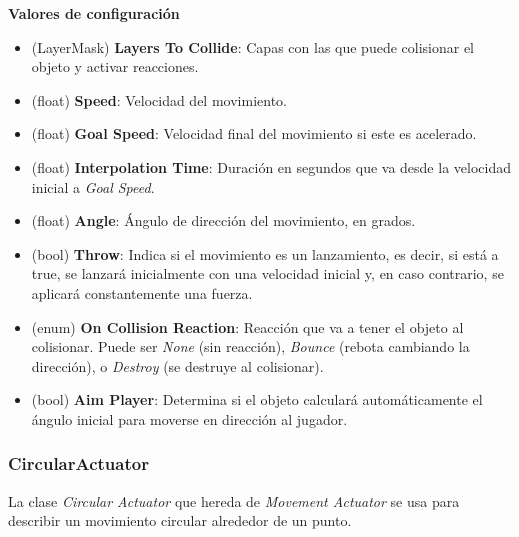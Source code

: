 \textbf{Valores de configuración}
\begin{itemize}
	\item (LayerMask) \textbf{Layers To Collide}: Capas con las que puede colisionar el objeto y activar reacciones.
	\item (float) \textbf{Speed}: Velocidad del movimiento.
	\item (float) \textbf{Goal Speed}: Velocidad final del movimiento si este es acelerado.
	\item (float) \textbf{Interpolation Time}: Duración en segundos que va desde la velocidad inicial a \textit{Goal Speed}.
	\item (float) \textbf{Angle}: Ángulo de dirección del movimiento, en grados.
	\item (bool) \textbf{Throw}: Indica si el movimiento es un lanzamiento, es decir, si está a true, se lanzará inicialmente con una velocidad inicial y, en caso contrario, se aplicará constantemente una fuerza.
	\item (enum) \textbf{On Collision Reaction}: Reacción que va a tener el objeto al colisionar. Puede ser \textit{None} (sin reacción), \textit{Bounce} (rebota cambiando la dirección), o \textit{Destroy} (se destruye al colisionar).
	\item (bool) \textbf{Aim Player}: Determina si el objeto calculará automáticamente el ángulo inicial para moverse en dirección al jugador.
\end{itemize}

\subsubsection{CircularActuator}
La clase \textit{Circular Actuator} que hereda de \textit{Movement Actuator} se usa para describir un movimiento circular alrededor de un punto.\\

